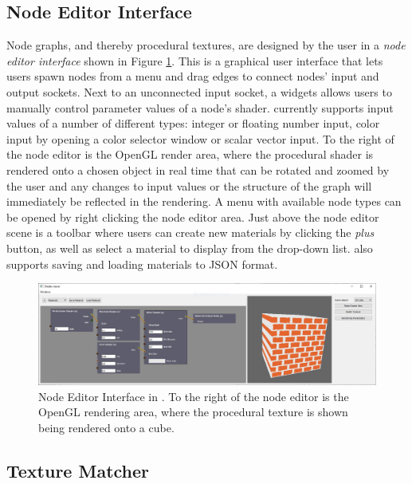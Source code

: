 \subsection{Node Editor Interface}\label{sec:NodeEditorInterface}

Node graphs, and thereby procedural textures, are designed by the user in a \textit{node editor interface} shown in Figure \ref{fig:NodeEditorInterface}. This is a graphical user interface that lets users spawn nodes from a menu and drag edges to connect nodes' input and output sockets. Next to an unconnected input socket, a widgets allows users to manually control parameter values of a node's shader. \dipter{} currently supports input values of a number of different types: integer or floating number input, color input by opening a color selector window or scalar vector input. To the right of the node editor is the OpenGL render area, where the procedural shader is rendered onto a chosen object in real time that can be rotated and zoomed by the user and any changes to input values or the structure of the graph will immediately be reflected in the rendering. A menu with available node types can be opened by right clicking the node editor area. Just above the node editor scene is a toolbar where users can create new materials by clicking the \emph{plus} button, as well as select a material to display from the drop-down list. \dipter{} also supports saving and loading materials to JSON format.
 
 
\begin{figure}[!h]
    \centering
    \includegraphics[width=.9\textwidth]{img/method/Node Editor.JPG}
    \caption{Node Editor Interface in \dipter{}. To the right of the node editor is the OpenGL rendering area, where the procedural texture is shown being rendered onto a cube.}
    \label{fig:NodeEditorInterface}
\end{figure}

\subsection{Texture Matcher}\label{sec:TextureMatcherInterface}

